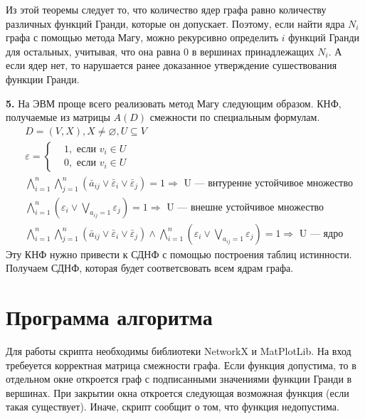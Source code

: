 \documentclass[12pt, letterpaper, titlepage]{article}
\let\emptyset\varnothing
\begin{document}
Из этой теоремы следует то, что количество ядер графа равно количеству различных функций Гранди, которые он допускает.
Поэтому, если найти ядра $N_i$ графа с помощью метода Магу, можно рекурсивно определить $i$ функций Гранди для остальных, учитывая, что
она равна 0 в вершинах принадлежащих $N_i$. А если ядер нет, то нарушается ранее доказанное утверждение сушествования функции Гранди.

\textbf{5. }На ЭВМ проще всего реализовать метод Магу следующим образом. КНФ, получаемые из матрицы $A(D)$ смежности по специальным формулам.
\[
    \begin{split}
        &D = (V,X), X \neq \emptyset, U \subseteq V\\
        &\varepsilon = 
        \begin{cases}
            &1, \text{ если } v_i \in U\\
            &0, \text{ если } v_i \in U
        \end{cases}\\
        &\bigwedge_{i=1}^{n}\bigwedge_{j=1}^{n}(\bar a_{ij} \vee \bar \varepsilon_i \vee \bar \varepsilon_j) = 1 \Rightarrow \text{ U --- внтуренне устойчивое множество}\\
        &\bigwedge_{i=1}^{n}(\varepsilon_i \vee \bigvee_{a_{ij}=1} \varepsilon_j) = 1 \Rightarrow \text{ U --- внешне устойчивое множество}\\
        &\bigwedge_{i=1}^{n}\bigwedge_{j=1}^{n}(\bar a_{ij} \vee \bar \varepsilon_i \vee \bar \varepsilon_j) \wedge \bigwedge_{i=1}^{n}(\varepsilon_i \vee \bigvee_{a_{ij}=1} \varepsilon_j) = 1 \Rightarrow \text{ U --- ядро}
    \end{split}
\]
Эту КНФ нужно привести к СДНФ с помощью построения таблиц истинности. Получаем СДНФ, которая будет соответсвовать всем ядрам графа.
\section{Программа алгоритма}
Для работы скрипта необходимы библиотеки NetworkX и MatPlotLib. На вход требеуется корректная матрица смежности графа.
Если функция допустима, то в отдельном окне откроется граф с подписанными значениями функции Гранди в вершинах. При закрытии окна откроется следующая возможная функция (если такая существует).
Иначе, скрипт сообщит о том, что функция недопустима.

\end{document}
